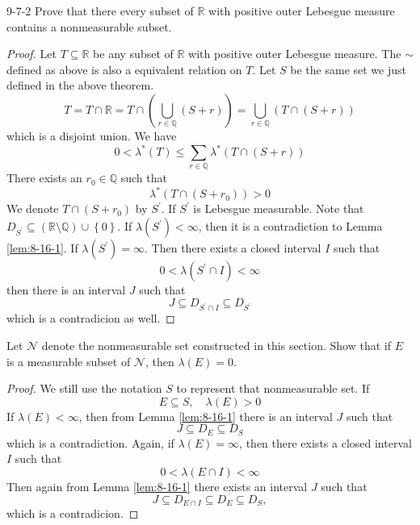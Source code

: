 \documentclass[../main.tex]{subfiles}
\begin{document}
\begin{exercise}{}{9-7-2}
    Prove that there every subset of \(  \mathbb{R}   \)  with
 positive outer Lebesgue measure contains a nonmeasurable subset.
\end{exercise}
\begin{proof}
    Let \(  T\subseteq \mathbb{R}   \) be any subset of \(  \mathbb{R}    \) with  positive outer Lebesgue measure. The \(  \sim   \) defined as above is also a equivalent relation on \(  T  \). Let \(  S  \) be the same set we just defined in the above theorem.  \[
    T= T\cap \mathbb{R} = T\cap \left( \bigcup _{r \in \mathbb{Q} }\left( S+ r \right)  \right)= \bigcup _{r \in \mathbb{Q} }\left( T\cap \left( S+ r \right)  \right)  
    \] which is a disjoint union. We have \[
   0<   \lambda ^{*}\left( T \right)\le \sum _{r \in \mathbb{Q} } \lambda ^{*}\left( T\cap \left( S+ r \right)  \right)  
    \]There exists an \(  r_0 \in \mathbb{Q}  \) such that \[
     \lambda ^{*}\left( T\cap \left(S+ r_0  \right)  \right)> 0 
    \] We denote \(  T\cap \left( S+ r_0 \right)   \) by \(  S^{\prime}   \). If \(  S^{\prime}   \) is Lebesgue measurable.  Note that \(  D_{S^{\prime} }\subseteq \left( \mathbb{R} \setminus \mathbb{Q}  \right)\cup \left\{ 0 \right\}   \). If \(   \lambda \left( S^{\prime}  \right)< \infty   \), then it is a contradiction to Lemma \ref{lem:8-16-1}. If \(   \lambda \left( S^{\prime}  \right)= \infty   \). Then there exists a closed interval \(  I  \) such that \[
    0<  \lambda \left( S^{\prime} \cap I \right)< \infty 
    \]   then there is an interval \(  J  \) such that \[
    J\subseteq D_{S^{\prime} \cap I}\subseteq D_{S^{\prime} }
    \] which is a contradicion as well. 
\end{proof}

\begin{exercise}{}{}
Let $\mathcal{N}$ denote the nonmeasurable set constructed in this section. Show that if $E$ is a measurable subset of $\mathcal{N}$, then $\lambda(E) = 0$.
\end{exercise}
\begin{proof}
    We still use the notation \(  S  \) to represent that nonmeasurable set. If \[
    E\subseteq S,\quad  \lambda \left( E \right)> 0 
    \] If \(   \lambda \left( E \right)< \infty   \), then from Lemma \ref{lem:8-16-1} there is an interval \(  J  \) such that \[
    J\subseteq D_{E}\subseteq D_{S}
    \] which is a contradiction.  Again, if \(   \lambda \left( E \right)= \infty   \), then there exists a closed interval \(  I  \) such that \[
    0<  \lambda \left( E\cap I \right)< \infty 
    \]  Then again from Lemma \ref{lem:8-16-1} there exists an interval \(  J  \) such that \[
    J\subseteq D_{E\cap I}\subseteq D_{E}\subseteq D_{S},
    \] which is a contradicion.
\end{proof}
\end{document}
